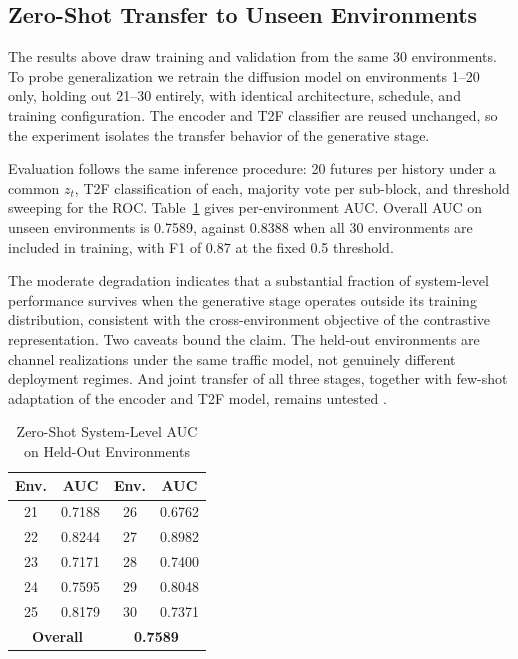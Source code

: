 \documentclass[lettersize,journal]{IEEEtran}
\begin{document}
\subsection{Zero-Shot Transfer to Unseen Environments}
\label{sec:zeroshot}
The results above draw training and validation from the same 30
environments. To probe generalization we retrain the diffusion model on
environments 1--20 only, holding out 21--30 entirely, with identical
architecture, schedule, and training configuration. The encoder and T2F
classifier are reused unchanged, so the experiment isolates the transfer
behavior of the generative stage.

Evaluation follows the same inference procedure: 20 futures per history
under a common $z_t$, T2F classification of each, majority vote per
sub-block, and threshold sweeping for the ROC. Table~\ref{tab:zeroshot}
gives per-environment AUC. Overall AUC on unseen environments is 0.7589,
against 0.8388 when all 30 environments are included in training, with
F1 of 0.87 at the fixed 0.5 threshold.

The moderate degradation indicates that a substantial fraction of
system-level performance survives when the generative stage operates
outside its training distribution, consistent with the
cross-environment objective of the contrastive representation. Two
caveats bound the claim. The held-out environments are channel
realizations under the same traffic model, not genuinely different
deployment regimes. And joint transfer of all three stages, together
with few-shot adaptation of the encoder and T2F model, remains untested
\cite{Cullen2023,Shaghluf2021,Nasser2021}.

\begin{table}[t]
\centering
\caption{Zero-Shot System-Level AUC on Held-Out Environments}
\label{tab:zeroshot}
\renewcommand{\arraystretch}{1.15}
\begin{tabular}{@{}cccc@{}}
\toprule
\textbf{Env.} & \textbf{AUC} & \textbf{Env.} & \textbf{AUC} \\
\midrule
21 & 0.7188 & 26 & 0.6762 \\
22 & 0.8244 & 27 & 0.8982 \\
23 & 0.7171 & 28 & 0.7400 \\
24 & 0.7595 & 29 & 0.8048 \\
25 & 0.8179 & 30 & 0.7371 \\
\midrule
\multicolumn{2}{c}{\textbf{Overall}} & \multicolumn{2}{c}{\textbf{0.7589}} \\
\bottomrule
\end{tabular}
\end{table}
\end{document}
